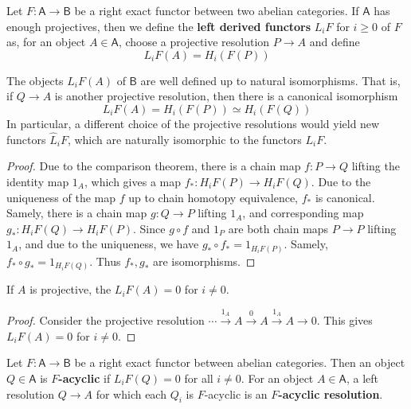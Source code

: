 \begin{defn} Let $F:\mathsf{A}\rightarrow \mathsf{B}$ be a right exact functor between two abelian categories. If $\mathsf{A}$ has enough projectives, then we define the \textbf{left derived functors} $L_i F$ for $i\geq 0$ of $F$ as, for an object $A\in \mathsf{A}$, choose a projective resolution $P\rightarrow A$ and define
\begin{equation}
L_i F(A)=H_i(F(P))
\end{equation}
\end{defn}

\begin{lemma} The objects $L_i F(A)$ of $\mathsf{B}$ are well defined up to natural isomorphisms. That is, if $Q\rightarrow A$ is another projective resolution, then there is a canonical isomorphism
\begin{equation}
L_iF(A)=H_i(F(P))\simeq H_i(F(Q))
\end{equation}
In particular, a different choice of the projective resolutions would yield new functors $\hat{L}_i F$, which are naturally isomorphic to the functors $L_i F$.
\end{lemma}
\begin{proof}
Due to the comparison theorem, there is a chain map $f:P\rightarrow Q$ lifting the identity map $1_A$, which gives a map $f_*:H_i F(P)\rightarrow H_i F(Q)$. Due to the uniqueness of the map $f$ up to chain homotopy equivalence, $f_*$ is canonical. Samely, there is a chain map $g:Q\rightarrow P$ lifting $1_A$, and corresponding map $g_*:H_i F(Q)\rightarrow H_i F(P)$. Since $g\circ f$ and $1_P$ are both chain maps $P\rightarrow P$ lifting $1_A$, and due to the uniqueness, we have $g_*\circ f_*=1_{H_i F(P)}$. Samely, $f_*\circ g_*=1_{H_i F(Q)}$. Thus $f_*,g_*$ are isomorphisms.
\end{proof}

\begin{cor} If $A$ is projective, the $L_i F(A)=0$ for $i\neq 0$.
\end{cor}
\begin{proof}
Consider the projective resolution $\cdots\xrightarrow{1_A} A\xrightarrow{0} A\xrightarrow{1_A} A\rightarrow 0$. This gives $L_i F(A)=0$ for $i\neq 0$.
\end{proof}

\begin{defn} Let $F:\mathsf{A}\rightarrow \mathsf{B}$ be a right exact functor between abelian categories. Then an object $Q\in \mathsf{A}$ is \textbf{$F$-acyclic} if $L_i F(Q)=0$ for all $i\neq 0$. For an object $A\in \mathsf{A}$, a left resolution $Q\rightarrow A$ for which each $Q_i$ is $F$-acyclic is an \textbf{$F$-acyclic resolution}.
\end{defn}

